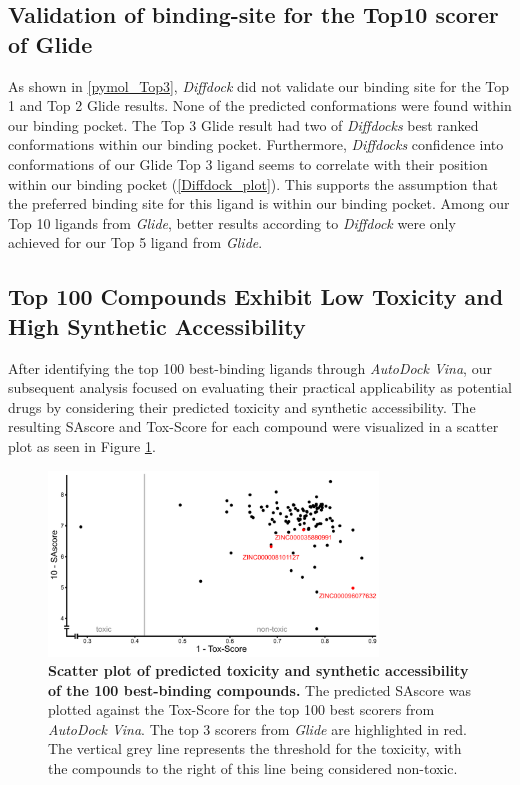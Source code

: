\documentclass[11pt, letterpaper, titlepage]{article}
\begin{document}
\subsection{Validation of binding-site for the Top10 scorer of Glide}
As shown in \autoref{pymol_Top3}, \textit{Diffdock} did not validate our binding site for the Top 1 and Top 2 Glide results. None of the predicted conformations were found within our binding pocket. The Top 3 Glide result had two of \textit{Diffdocks} best ranked conformations within our binding pocket. Furthermore, \textit{Diffdocks} confidence into conformations of our Glide Top 3 ligand seems to correlate with their position within our binding pocket (\autoref{Diffdock_plot}). This supports the assumption that the preferred binding site for this ligand is within our binding pocket. Among our Top 10 ligands from \textit{Glide}, better results according to \textit{Diffdock} were only achieved for our Top 5 ligand from \textit{Glide}.

\subsection{Top 100 Compounds Exhibit Low Toxicity and High Synthetic Accessibility}
After identifying the top 100 best-binding ligands through \textit{AutoDock Vina}, our subsequent analysis focused on evaluating their practical applicability as potential drugs by considering their predicted toxicity and synthetic accessibility. The resulting SAscore and Tox-Score for each compound were visualized in a scatter plot as seen in {Figure \ref{eToxPred}}. 

\begin{figure}[h]
    \begin{center}
      \includegraphics[width=0.78\textwidth]{etoxpred_result.pdf}
    \end{center}
    \caption{\textbf{Scatter plot of predicted toxicity and synthetic accessibility of the 100 best-binding compounds.} The predicted \ac{SAscore} was plotted against the Tox-Score for the top 100 best scorers from \textit{AutoDock Vina}. The top 3 scorers from \textit{Glide} are highlighted in red. The vertical grey line represents the threshold for the toxicity, with the compounds to the right of this line being considered non-toxic.}\label{eToxPred}
  \end{figure}
\end{document}
